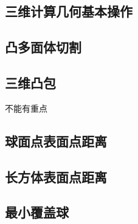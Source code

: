 \documentclass[landscape, twocolumn, 8pt, a4paper, twoside]{extarticle}
\begin{document}
  \subsection{三维计算几何基本操作}
    

  \subsection{凸多面体切割}
    

  \subsection{三维凸包}
    不能有重点
    

  \subsection{球面点表面点距离}
    
    
  \subsection{长方体表面点距离}
    

  \subsection{最小覆盖球}
    
  
\end{document}
